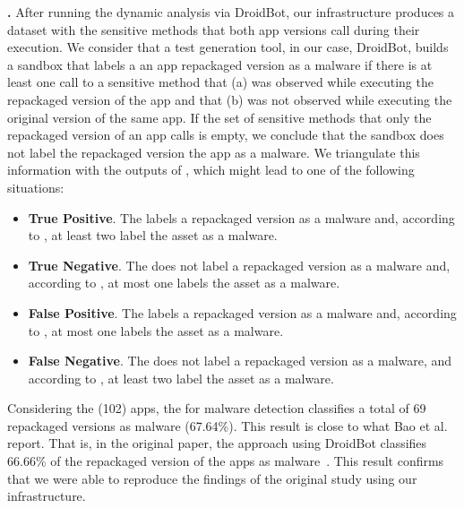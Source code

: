 {\bf \sds.}
After running the dynamic analysis via DroidBot, our infrastructure produces
a dataset with the sensitive methods that both app versions call during their execution. We consider that a test
generation tool, in our case, DroidBot, builds a sandbox that labels a an app repackaged version
as a malware if there is at least one call to a sensitive method that (a) was observed
while executing the repackaged version of the app and that (b) was not observed while
executing the original version of the same app. 
If the set of sensitive methods that only the repackaged version of an app calls is empty,
we conclude that the sandbox does not label the repackaged version the app as a malware. We triangulate
this information with the outputs of \vt, which might lead to one of the following
situations:

\begin{itemize}
\item {\bf True Positive}. The \mas labels a repackaged version as a malware and, according to
  \vt, at least two \ses label the asset as a malware.
  
\item {\bf True Negative}. The \mas does not label a repackaged version as a malware and,
  according to \vt, at most one \se labels the asset as a malware. 

\item {\bf False Positive}. The \mas labels a repackaged version as a malware and, according to
  \vt, at most one \se labels the asset as a malware.

\item {\bf False Negative}. The \mas does not label a repackaged version as a malware, and
  according to \vt, at least two \ses label the asset as a malware.
\end{itemize}



Considering the \sds (102) apps, the \mas for malware detection 
classifies a total of 69 repackaged versions as malware (67.64\%).
This result is close to what Bao et al. report. That is, in the
original paper,  the \mas approach using DroidBot classifies 66.66\% of the
repackaged version of the apps as malware~\cite{DBLP:conf/wcre/BaoLL18}.
This result confirms that we were able to reproduce
the findings of the original study using our
infrastructure. 


